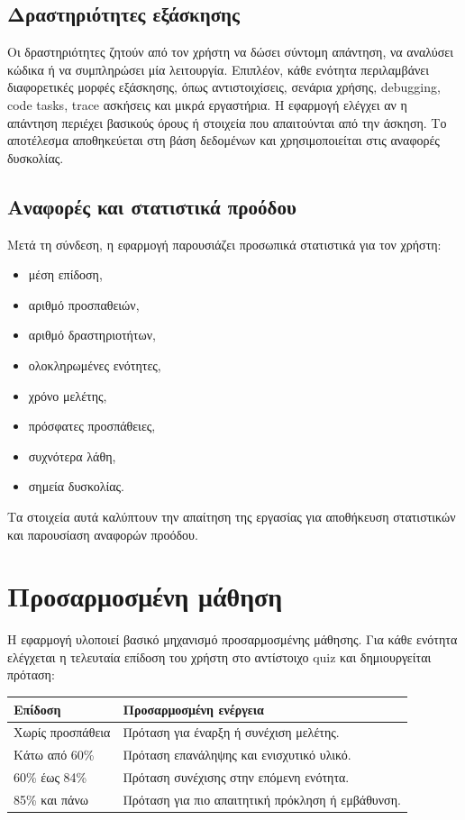\documentclass[a4paper]{article}
\begin{document}
\subsection{Δραστηριότητες εξάσκησης}

Οι δραστηριότητες ζητούν από τον χρήστη να δώσει σύντομη απάντηση, να αναλύσει κώδικα ή να συμπληρώσει μία λειτουργία. Επιπλέον, κάθε ενότητα περιλαμβάνει διαφορετικές μορφές εξάσκησης, όπως αντιστοιχίσεις, σενάρια χρήσης, debugging, code tasks, trace ασκήσεις και μικρά εργαστήρια. Η εφαρμογή ελέγχει αν η απάντηση περιέχει βασικούς όρους ή στοιχεία που απαιτούνται από την άσκηση. Το αποτέλεσμα αποθηκεύεται στη βάση δεδομένων και χρησιμοποιείται στις αναφορές δυσκολίας.

\subsection{Αναφορές και στατιστικά προόδου}

Μετά τη σύνδεση, η εφαρμογή παρουσιάζει προσωπικά στατιστικά για τον χρήστη:

\begin{itemize}[leftmargin=1.2cm]
  \item μέση επίδοση,
  \item αριθμό προσπαθειών,
  \item αριθμό δραστηριοτήτων,
  \item ολοκληρωμένες ενότητες,
  \item χρόνο μελέτης,
  \item πρόσφατες προσπάθειες,
  \item συχνότερα λάθη,
  \item σημεία δυσκολίας.
\end{itemize}

Τα στοιχεία αυτά καλύπτουν την απαίτηση της εργασίας για αποθήκευση στατιστικών και παρουσίαση αναφορών προόδου.

\section{Προσαρμοσμένη μάθηση}

Η εφαρμογή υλοποιεί βασικό μηχανισμό προσαρμοσμένης μάθησης. Για κάθε ενότητα ελέγχεται η τελευταία επίδοση του χρήστη στο αντίστοιχο quiz και δημιουργείται πρόταση:

\begin{longtable}{|p{4cm}|p{10cm}|}
\hline
\textbf{Επίδοση} & \textbf{Προσαρμοσμένη ενέργεια} \\
\hline
Χωρίς προσπάθεια & Πρόταση για έναρξη ή συνέχιση μελέτης. \\
\hline
Κάτω από 60\% & Πρόταση επανάληψης και ενισχυτικό υλικό. \\
\hline
60\% έως 84\% & Πρόταση συνέχισης στην επόμενη ενότητα. \\
\hline
85\% και πάνω & Πρόταση για πιο απαιτητική πρόκληση ή εμβάθυνση. \\
\hline
\end{longtable}
\end{document}
